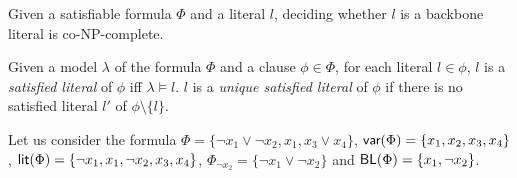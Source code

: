 \begin{theorem}
\label{thm:co-NP}\cite{Jan10}
Given a satisfiable formula $\Phi$ and a literal $l$, deciding whether $l$ is a backbone literal is co-NP-complete.
\end{theorem}


\begin{definition}
Given a model $\lambda$ of the formula $\Phi$ and a clause $\phi\in\Phi$, for each literal $l\in\phi$, $l$ is a \emph{satisfied literal}
of $\phi$ iff $\lambda\models l$. $l$ is a \emph{unique satisfied literal} of $\phi$ if there is no satisfied literal $l'$ of $\phi\setminus\{l\}$.
\end{definition}


Let us consider the formula $\Phi=\{\neg x_1 \vee \neg x_2, x_1, x_3 \vee x_4\}$,
$\textsf{var}(\Phi)=\{x_1, x_2, x_3, x_4\}$, $\textsf{lit}(\Phi)=\{\neg x_1, x_1, \neg x_2, x_3, x_4\}$, $\Phi_{\neg x_2}=\{\neg x_1 \vee \neg x_2\}$ and $\textsf{BL}(\Phi)=\{x_1, \neg x_2\}$.



